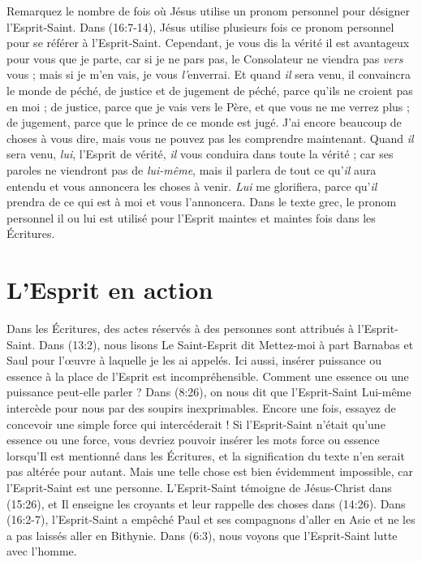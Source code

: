Remarquez le nombre de fois où Jésus utilise un pronom personnel pour
 désigner l'Esprit-Saint. Dans (16:7-14), Jésus utilise
 plusieurs fois ce pronom personnel pour se référer à l'Esprit-Saint.
 \Og Cependant, je vous dis la vérité\frcolon{} il est avantageux pour vous
 que je parte, car si je ne pars pas, le Consolateur ne viendra pas
 \emph{vers} vous ; mais si je m'en vais, je vous \emph{l'}enverrai.
 Et quand \emph{il} sera venu, il convaincra le monde de péché,
 de justice et de jugement\frcolon{} de péché, parce qu'ils ne croient pas en moi ;
 de justice, parce que je vais vers le Père, et que vous ne me verrez plus ;
 de jugement, parce que le prince de ce monde est jugé.
 J'ai encore beaucoup de choses à vous dire, mais vous ne pouvez pas
 les comprendre maintenant. Quand \emph{il} sera venu, \emph{lui},
 l'Esprit de vérité, \emph{il} vous conduira dans toute la vérité ;
 car ses paroles ne viendront pas de \emph{lui-même}, mais il parlera de
 tout ce qu'\emph{il} aura entendu et vous annoncera les choses à venir.
 \emph{Lui} me glorifiera, parce qu'\emph{il} prendra de ce qui est à moi
 et vous l'annoncera. \Fg{}
 Dans le texte grec, le pronom personnel \Og il \Fg{} ou \Og lui \Fg{}
 est utilisé pour l'Esprit maintes et maintes fois dans les Écritures.

\section{L'Esprit en action}

Dans les Écritures, des actes réservés à des personnes sont attribués à l'Esprit-Saint.
 Dans (13:2), nous lisons\frcolon{} \Og Le Saint-Esprit dit\frcolon{}
 Mettez-moi à part Barnabas et Saul pour l'œuvre à laquelle je les ai
 appelés. \Fg{}
 Ici aussi, insérer \Og puissance \Fg{} ou \Og essence \Fg{} à la place
 de l'Esprit est incompréhensible. Comment une essence ou une puissance
 peut-elle parler ? Dans (8:26), on nous dit que l'Esprit-Saint
 Lui-même intercède pour nous par des soupirs inexprimables.
 Encore une fois, essayez de concevoir une simple force qui intercéderait !
 Si l'Esprit-Saint n'était qu'une essence ou une force, vous devriez pouvoir
 insérer les mots \Og force \Fg{} ou \Og essence \Fg{} lorsqu'Il est mentionné
 dans les Écritures, et la signification du texte n'en serait pas altérée pour
 autant. Mais une telle chose est bien évidemment impossible, car
 l'Esprit-Saint est une personne. L'Esprit-Saint témoigne de Jésus-Christ dans
 (15:26), et Il enseigne les croyants et leur rappelle des choses
 dans (14:26). Dans (16:2-7), l'Esprit-Saint a
 empêché Paul et ses compagnons d'aller en Asie et ne les a pas laissés aller
 en Bithynie. Dans (6:3), nous voyons que l'Esprit-Saint lutte
 avec l'homme.

